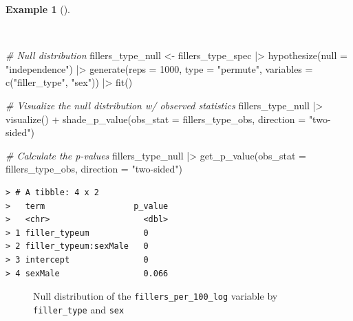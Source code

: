 \documentclass[
  letterpaper,
  DIV=11,
  numbers=noendperiod]{scrreprt}
\newenvironment{Shaded}{\begin{snugshade}}{\end{snugshade}}
\newcommand{\AttributeTok}[1]{\textcolor[rgb]{0.00,0.00,0.00}{#1}}
\newcommand{\CommentTok}[1]{\textcolor[rgb]{0.00,0.00,0.00}{\textit{#1}}}
\newcommand{\DecValTok}[1]{\textcolor[rgb]{0.00,0.00,0.00}{#1}}
\newcommand{\FunctionTok}[1]{\textcolor[rgb]{0.00,0.00,0.00}{#1}}
\newcommand{\NormalTok}[1]{\textcolor[rgb]{0.00,0.00,0.00}{#1}}
\newcommand{\OtherTok}[1]{\textcolor[rgb]{0.00,0.00,0.00}{#1}}
\newcommand{\SpecialCharTok}[1]{\textcolor[rgb]{0.00,0.00,0.00}{#1}}
\newcommand{\StringTok}[1]{\textcolor[rgb]{0.00,0.00,0.00}{#1}}
\theoremstyle{definition}
\newtheorem{example}{Example}[chapter]
\theoremstyle{remark}
\begin{document}
\begin{example}[]\protect\hypertarget{exm-ida-num-multi-null}{}\label{exm-ida-num-multi-null}

~

\begin{Shaded}
\begin{Highlighting}[]
\CommentTok{\# Null distribution}
\NormalTok{fillers\_type\_null }\OtherTok{\textless{}{-}}
\NormalTok{  fillers\_type\_spec }\SpecialCharTok{|\textgreater{}}
  \FunctionTok{hypothesize}\NormalTok{(}\AttributeTok{null =} \StringTok{"independence"}\NormalTok{) }\SpecialCharTok{|\textgreater{}}
  \FunctionTok{generate}\NormalTok{(}\AttributeTok{reps =} \DecValTok{1000}\NormalTok{, }\AttributeTok{type =} \StringTok{"permute"}\NormalTok{, }\AttributeTok{variables =} \FunctionTok{c}\NormalTok{(}\StringTok{"filler\_type"}\NormalTok{, }\StringTok{"sex"}\NormalTok{)) }\SpecialCharTok{|\textgreater{}}
  \FunctionTok{fit}\NormalTok{()}

\CommentTok{\# Visualize the null distribution w/ observed statistics}
\NormalTok{fillers\_type\_null }\SpecialCharTok{|\textgreater{}}
  \FunctionTok{visualize}\NormalTok{() }\SpecialCharTok{+}
  \FunctionTok{shade\_p\_value}\NormalTok{(}\AttributeTok{obs\_stat =}\NormalTok{ fillers\_type\_obs, }\AttributeTok{direction =} \StringTok{"two{-}sided"}\NormalTok{)}

\CommentTok{\# Calculate the p{-}values}
\NormalTok{fillers\_type\_null }\SpecialCharTok{|\textgreater{}}
  \FunctionTok{get\_p\_value}\NormalTok{(}\AttributeTok{obs\_stat =}\NormalTok{ fillers\_type\_obs, }\AttributeTok{direction =} \StringTok{"two{-}sided"}\NormalTok{)}
\end{Highlighting}
\end{Shaded}

\begin{verbatim}
> # A tibble: 4 x 2
>   term                  p_value
>   <chr>                   <dbl>
> 1 filler_typeum           0    
> 2 filler_typeum:sexMale   0    
> 3 intercept               0    
> 4 sexMale                 0.066
\end{verbatim}

\begin{figure}[H]


\caption{\label{fig-ida-num-multi-null}Null distribution of the
\texttt{fillers\_per\_100\_log} variable by \texttt{filler\_type} and
\texttt{sex}}

\end{figure}%

\end{example}
\end{document}
